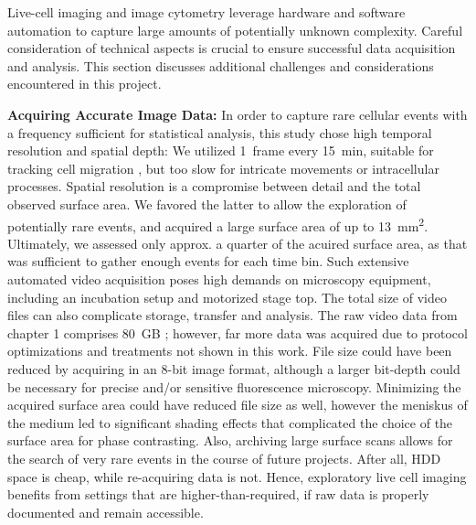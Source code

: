 %
\label{sec:discussion_quantifying_microscopy}%
Live-cell imaging and image cytometry leverage hardware and software automation
to capture large amounts of potentially unknown complexity. Careful
consideration of technical aspects is crucial to ensure successful data
acquisition and analysis. This section discusses additional challenges and
considerations encountered in this project.

\textbf{Acquiring Accurate Image Data:}
In order to capture rare cellular events with a frequency sufficient for
statistical analysis, this study chose high temporal resolution and spatial
depth: We utilized \SI{1}{frame} every \SI{15}{\minute}, suitable for tracking
cell migration \cite{huthSignificantlyImprovedPrecision2010}, but too slow for
intricate movements or intracellular processes. Spatial resolution is a
compromise between detail and the total observed surface area. We favored the
latter to allow the exploration of potentially rare events, and acquired a
 large surface area of up to
\SI{13}{\milli\meter\squared}. Ultimately, we assessed only approx. a quarter of
the acuired surface area, as that was sufficient to gather enough events for
each time bin. Such extensive automated video acquisition poses high demands on
microscopy equipment, including an incubation setup and motorized stage top. The
total size of video files can also complicate storage, transfer and analysis.
The raw video data from chapter 1 comprises \SI{80}{GB}
\cite{biostudiesBioStudiesEuropeanBioinformatics}; however, far more data was
acquired due to protocol optimizations and treatments not shown in this work.
File size could have been reduced by acquiring in an 8-bit image format,
although a larger bit-depth could be necessary for precise and/or sensitive
fluorescence microscopy. Minimizing the acquired surface area could have reduced
file size as well, however the meniskus of the medium led to significant shading
effects that complicated the choice of the surface area for phase contrasting.
Also, archiving large surface scans allows for the search of very rare events in
the course of future projects. After all, HDD space is cheap, while re-acquiring
data is not. Hence, exploratory live cell imaging benefits from settings that
are higher-than-required, if raw data is properly documented and remain
accessible.



